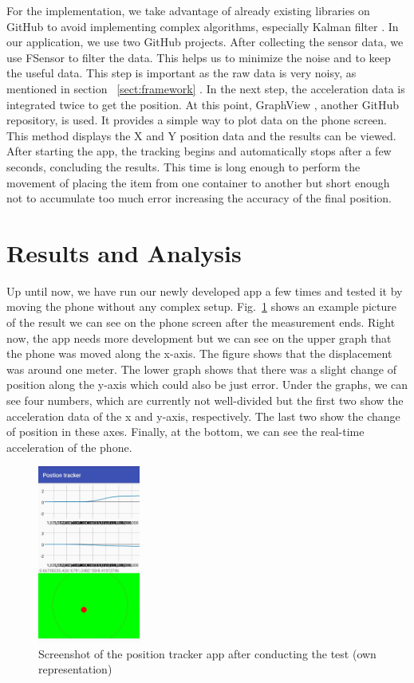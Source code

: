 \documentclass[12pt,twoside, hidelinks]{article}
\begin{document}
 For the implementation, we  take advantage of already existing libraries on GitHub to avoid implementing complex algorithms, especially Kalman filter \cite{Kalman_filter_book}. In our application, we use two GitHub \cite{github} projects. After collecting the sensor data, we use FSensor \cite{KalebKE_2018} to filter the data. This helps us to minimize the noise and to keep the useful data. This step is important as the raw data is very noisy, as mentioned in section ~\ref{sect:framework} . In the next step, the acceleration data is integrated twice to get the position. At this point, GraphView \cite{Graphview}, another GitHub repository, is used. It provides a simple way to plot data on the phone screen. This method displays the X and Y position data and the results can be viewed. After starting the app, the tracking begins and automatically stops after a few seconds, concluding the results. This time is long enough to perform the movement of placing the item from one container to another but short enough not to accumulate too much error increasing the accuracy of the final position.

\section{Results and Analysis}
\label{sec:results}

Up until now, we have run our newly developed app a few times and tested it by moving the phone without any complex setup. Fig.~\ref{fig:app1} shows an example picture of the result we can see on the phone screen after the measurement ends. Right now, the app needs more development but we can see on the upper graph that the phone was moved along the x-axis. The figure shows that the displacement was around one meter. The lower graph shows that there was a slight change of position along the y-axis which could also be just error. Under the graphs, we can see four numbers, which are currently not well-divided but the first two show the acceleration data of the x and y-axis, respectively. The last two show the change of position in these axes. Finally, at the bottom, we can see the real-time acceleration of the phone.
\begin{figure}[H]
	\begin{center}
		\includegraphics[width=0.3\textwidth]{figures/app1}
		\caption{Screenshot of the position tracker app after conducting the test (own representation)}
		\label{fig:app1}
	\end{center}
\end{figure}
\end{document}
